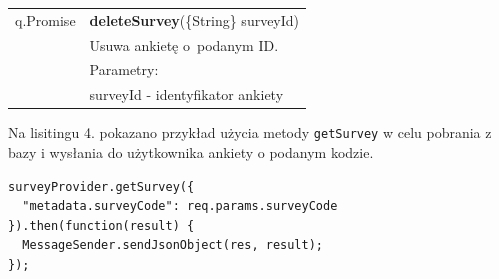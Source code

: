 \documentclass[12pt,a4paper,notitlepage]{article}
\begin{document}
\begin{center}
\begin{table}[H]
\begin{tabular}{| l| l|}
q.Promise	&	\textbf{deleteSurvey}(\{String\} surveyId) \\
 &  Usuwa ankietę o~podanym ID.\\ 
 & Parametry: \\
 & surveyId - identyfikator ankiety \\ 
 \hline
  \end{tabular}
\end{table}
\end{center}

\par Na lisitingu 4. pokazano przykład użycia metody \texttt{getSurvey} w celu pobrania z bazy i wysłania do użytkownika ankiety o podanym kodzie.

\begin{lstlisting}[caption=Przykład użycia metody \texttt{getSurvey} ]
surveyProvider.getSurvey({
  "metadata.surveyCode": req.params.surveyCode
}).then(function(result) {
  MessageSender.sendJsonObject(res, result);
});
\end{lstlisting}
\end{document}
